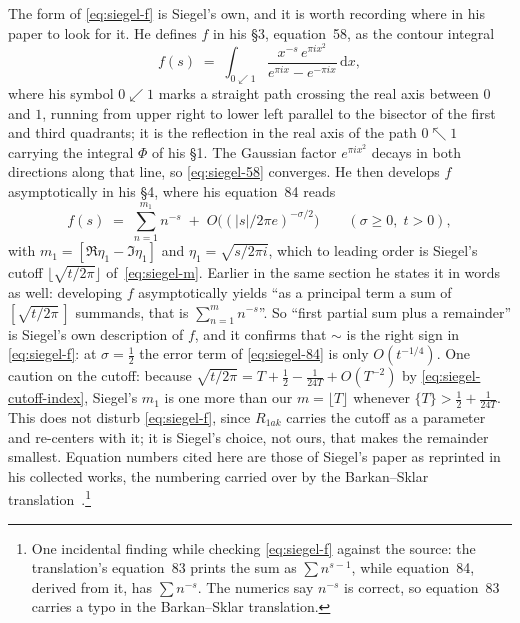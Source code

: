 \documentclass[11pt]{article}
\theoremstyle{definition}
\begin{document}
The form of \eqref{eq:siegel-f} is Siegel's own, and it is worth recording where
in his paper to look for it. He defines $f$ in his \S3, equation~58, as the
contour integral
\begin{equation}\label{eq:siegel-58}
f(s)
\;=\;
\int_{0\swarrow 1}
\frac{x^{-s}\,e^{\pi i x^{2}}}{e^{\pi i x}-e^{-\pi i x}}\,\mathrm{d}x ,
\end{equation}
where his symbol $0\swarrow 1$ marks a straight path crossing the real axis
between $0$ and $1$, running from upper right to lower left parallel to the
bisector of the first and third quadrants; it is the reflection in the real axis
of the path $0\nwarrow 1$ carrying the integral $\Phi$ of his \S1. The Gaussian
factor $e^{\pi i x^{2}}$ decays in both directions along that line, so
\eqref{eq:siegel-58} converges. He then develops $f$ asymptotically in his \S4,
where his equation~84 reads
\begin{equation}\label{eq:siegel-84}
f(s)
\;=\;
\sum_{n=1}^{m_{1}} n^{-s}
\;+\;
O\!\bigl((\lvert s\rvert/2\pi e)^{-\sigma/2}\bigr)
\qquad (\sigma\ge 0,\; t>0),
\end{equation}
with $m_{1}=[\Re\eta_{1}-\Im\eta_{1}]$ and $\eta_{1}=\sqrt{s/2\pi i}$, which to
leading order is Siegel's cutoff $\lfloor\sqrt{t/2\pi}\rfloor$
of~\eqref{eq:siegel-m}. Earlier in the same section he states it in words as
well: developing $f$ asymptotically yields ``as a principal term a sum of
$[\sqrt{t/2\pi}\,]$ summands, that is $\sum_{n=1}^{m}n^{-s}$''. So ``first
partial sum plus a remainder'' is Siegel's own description of $f$, and it
confirms that $\sim$ is the right sign in \eqref{eq:siegel-f}: at
$\sigma=\tfrac12$ the error term of \eqref{eq:siegel-84} is only
$O(t^{-1/4})$. One caution on the cutoff: because
$\sqrt{t/2\pi}=T+\tfrac12-\tfrac1{24T}+O(T^{-2})$ by
\eqref{eq:siegel-cutoff-index}, Siegel's $m_{1}$ is one more than our
$m=\lfloor T\rfloor$ whenever $\{T\}>\tfrac12+\tfrac1{24T}$. This does not disturb
\eqref{eq:siegel-f}, since $R_{1ak}$ carries the cutoff as a parameter and
re-centers with it; it is Siegel's choice, not ours, that makes the remainder
smallest. Equation numbers cited here are those of Siegel's paper as reprinted
in his collected works, the numbering carried over by the Barkan--Sklar
translation~\cite{BarkanSklar2018}.\footnote{One incidental finding while
checking \eqref{eq:siegel-f} against the source: the translation's
equation~83 prints the sum as $\sum n^{s-1}$, while equation~84, derived from
it, has $\sum n^{-s}$. The numerics say $n^{-s}$ is correct, so equation~83
carries a typo in the Barkan--Sklar translation.}
\end{document}
